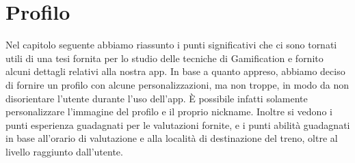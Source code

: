\section{Profilo\label{sec:profilo}}
Nel capitolo seguente abbiamo riassunto i punti significativi che ci sono tornati utili di una tesi fornita per lo studio delle tecniche di Gamification e fornito alcuni dettagli relativi alla nostra app.
In base a quanto appreso, abbiamo deciso di fornire un profilo con alcune personalizzazioni, ma non troppe, in modo da non disorientare l'utente durante l'uso dell'app.
È possibile infatti solamente personalizzare l'immagine del profilo e il proprio nickname.
Inoltre si vedono i punti esperienza guadagnati per le valutazioni fornite, e i punti abilità guadagnati in base all'orario di valutazione e alla località di destinazione del treno, oltre al livello raggiunto dall'utente.